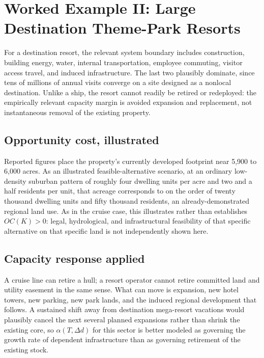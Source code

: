 \documentclass[11pt]{article}
\begin{document}
\section{Worked Example II: Large Destination Theme-Park Resorts}

For a destination resort, the relevant system boundary includes construction, building energy, water, internal transportation, employee commuting, visitor access travel, and induced infrastructure. The last two plausibly dominate, since tens of millions of annual visits converge on a site designed as a nonlocal destination. Unlike a ship, the resort cannot readily be retired or redeployed: the empirically relevant capacity margin is avoided expansion and replacement, not instantaneous removal of the existing property.

\subsection{Opportunity cost, illustrated}

Reported figures place the property's currently developed footprint near 5{,}900 to 6{,}000 acres. As an illustrated feasible-alternative scenario, at an ordinary low-density suburban pattern of roughly four dwelling units per acre and two and a half residents per unit, that acreage corresponds to on the order of twenty thousand dwelling units and fifty thousand residents, an already-demonstrated regional land use. As in the cruise case, this illustrates rather than establishes $OC(K) > 0$: legal, hydrological, and infrastructural feasibility of that specific alternative on that specific land is not independently shown here.

\subsection{Capacity response applied}

A cruise line can retire a hull; a resort operator cannot retire committed land and utility easement in the same sense. What can move is expansion, new hotel towers, new parking, new park lands, and the induced regional development that follows. A sustained shift away from destination mega-resort vacations would plausibly cancel the next several planned expansions rather than shrink the existing core, so $\alpha(T,\Delta d)$ for this sector is better modeled as governing the growth rate of dependent infrastructure than as governing retirement of the existing stock.
\end{document}

